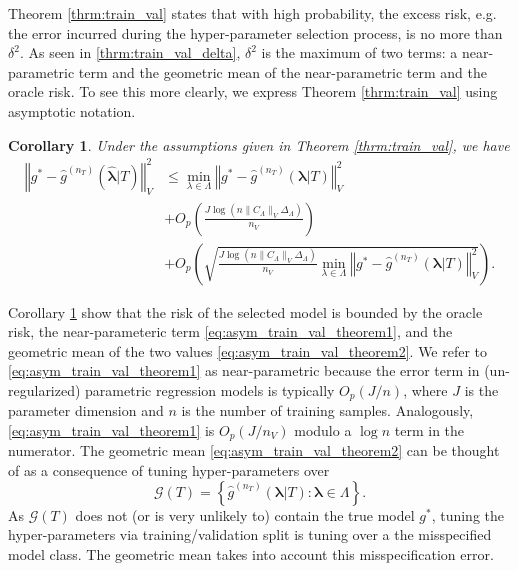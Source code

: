 \documentclass[12pt]{article} %
\newtheorem{corollary}{Corollary}
\theoremstyle{definition}
\begin{document}
\noindent
Theorem \ref{thrm:train_val} states that with high probability, the excess risk, e.g. the error incurred during the hyper-parameter selection process, is no more than $\delta^2$.
As seen in \eqref{thrm:train_val_delta}, $\delta^2$ is the maximum of two terms: a near-parametric term and the geometric mean of the near-parametric term and the oracle risk. To see this more clearly, we express Theorem \ref{thrm:train_val} using asymptotic notation.
\begin{corollary}
	\label{corr:train_val}
	Under the assumptions given in Theorem \ref{thrm:train_val}, we have
	\begin{align}
	\left\Vert g^* - \hat{g}^{(n_T)}( \hat{\boldsymbol{\lambda}} | T) \right\Vert _{V}^2 &
	\le \min_{\lambda \in \Lambda} \left\Vert g^* - \hat{g}^{(n_T)}( {\boldsymbol{\lambda}} | T) \right \Vert^2_{V}
	\label{eq:asym_train_val_oracle_risk}
	\\
	& + O_p \left(\frac{J\log (n \|C_\Lambda\|_V \Delta_{\Lambda} )}{n_{V}} \right) 
	\label{eq:asym_train_val_theorem1} \\
	& + O_p \left(
	\sqrt{
		\frac{J \log (n \|C_\Lambda\|_V \Delta_{\Lambda} )}{n_{V}}
		\min_{\lambda \in \Lambda} \left\Vert g^* - \hat{g}^{(n_T)}( {\boldsymbol{\lambda}} | T) \right \Vert^2_{V}
	}
	\right ).
	\label{eq:asym_train_val_theorem2}
	\end{align}
\end{corollary}
\noindent
Corollary \ref{corr:train_val} show that the risk of the selected model is bounded by the oracle risk, the near-parameteric term \eqref{eq:asym_train_val_theorem1}, and the geometric mean of the two values \eqref{eq:asym_train_val_theorem2}.
We refer to \eqref{eq:asym_train_val_theorem1} as near-parametric because the error term in (un-regularized) parametric regression models is typically $O_p(J/n)$, where $J$ is the parameter dimension and $n$ is the number of training samples. Analogously, \eqref{eq:asym_train_val_theorem1} is $O_p(J/n_V)$ modulo a $\log n$ term in the numerator.
The geometric mean \eqref{eq:asym_train_val_theorem2} can be thought of as a consequence of tuning hyper-parameters over
\begin{equation}
\mathcal{G}(T) = \left \{ \hat{g}^{(n_T)}( {\boldsymbol{\lambda}}| T) : \boldsymbol{\lambda} \in \Lambda \right \}.
\end{equation}
As $\mathcal{G}(T)$ does not (or is very unlikely to) contain the true model $g^*$, tuning the hyper-parameters via training/validation split is tuning over a the misspecified model class.
The geometric mean takes into account this misspecification error.
\end{document}
